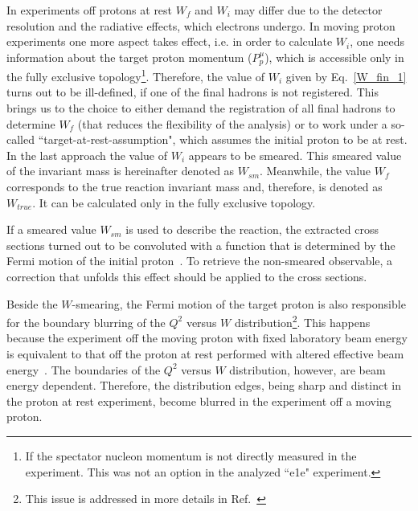 In experiments off protons at rest $W_{f}$ and $W_{i}$ may differ due to the detector resolution and the radiative effects, which electrons undergo. In moving proton experiments one more aspect takes effect, i.e. in order to calculate $W_{i}$, one needs information about the target proton momentum ($P_{p}^{\mu}$), which is accessible only in the fully exclusive topology\footnote[2]{If the spectator nucleon momentum is not directly measured in the experiment. This was not an option in the analyzed ``e1e" experiment. }. Therefore, the value of  $W_{i}$ given by Eq.~\eqref{W_fin_1} turns out to be ill-defined, if one of the final hadrons is not registered. This brings us to the choice to either demand the registration of all final hadrons to determine $W_{f}$ (that reduces the flexibility of the analysis) or to work under a so-called ``target-at-rest-assumption", which assumes the initial proton to be at rest. In the last approach the value of $W_{i}$ appears to be smeared. This smeared value of the invariant mass is hereinafter denoted as $W_{sm}$. Meanwhile, the value $W_{f}$ corresponds to the true reaction invariant mass and, therefore, is denoted as $W_{true}$. It can be calculated only in the fully exclusive topology.

If a smeared value $W_{sm}$ is used to describe the reaction, the extracted cross sections turned out to be convoluted with a function that is determined by the Fermi motion of the initial proton~\cite{Skorodumina:2015rea,twopeg-d}. To retrieve the non-smeared observable, a correction that unfolds this effect should be applied to the cross sections.


Beside the $W$-smearing, the Fermi motion of the target proton is also responsible for the boundary blurring of the $Q^{2}$ versus $W$ distribution\footnote[3]{This issue is addressed in more details in Ref.~\cite{twopeg-d}}. This happens because the experiment off the moving proton with fixed laboratory beam energy is equivalent to that off the proton at rest performed with altered effective beam energy~\cite{twopeg-d}. The boundaries of the $Q^{2}$ versus $W$ distribution, however, are beam energy dependent. Therefore, the distribution edges, being sharp and distinct in the proton at rest experiment, become blurred in the experiment off a moving proton.



